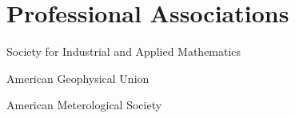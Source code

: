 \documentclass[]{deedy-resume-openfont}
\begin{document}
\begin{minipage}[t]{0.66\textwidth}
\section{Professional Associations}
\vspace{\topsep} 
\begin{tightemize}
    \item Society for Industrial and Applied Mathematics\\
    \item American Geophysical Union\\
    \item American Meterological Society\\
\end{tightemize}

\end{minipage} 
\end{document}
